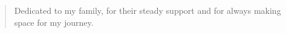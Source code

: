 
\begin{center}
    \thispagestyle{empty}
    \vspace*{\fill}
    \begin{quotation}
        Dedicated to my family, for their steady support and for always making space for my journey.
    \end{quotation}
    \vspace*{\fill}
\end{center}
